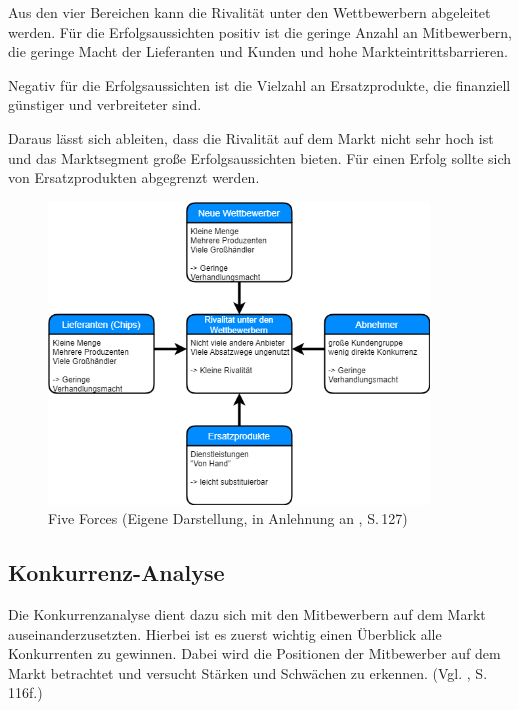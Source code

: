         \noindent
        Aus den vier Bereichen kann die Rivalität unter den Wettbewerbern abgeleitet werden. Für die Erfolgsaussichten
        positiv ist die geringe Anzahl an Mitbewerbern, die geringe Macht der Lieferanten und Kunden und hohe
        Markteintrittsbarrieren.

        \noindent
        Negativ für die Erfolgsaussichten ist die Vielzahl an Ersatzprodukte, die finanziell günstiger und verbreiteter
        sind.

        \noindent
        Daraus lässt sich ableiten, dass die Rivalität auf dem Markt nicht sehr hoch ist und das Marktsegment große
        Erfolgsaussichten bieten. Für einen Erfolg sollte sich von Ersatzprodukten abgegrenzt werden.
        \pagebreak

        \begin{figure}[ht]
            \centering
            \includegraphics[width = 0.9\textwidth]{Eigene Darstellungen/Distributionswege2.png}

            \caption{Five Forces (Eigene Darstellung, in Anlehnung an \cite{Gamayanto2005}, S.\,127)}
        \end{figure}

        \subsection{Konkurrenz-Analyse}

            Die Konkurrenzanalyse dient dazu sich mit den Mitbewerbern auf dem Markt auseinanderzusetzten. Hierbei ist
            es zuerst wichtig einen Überblick alle Konkurrenten zu gewinnen. Dabei wird die Positionen der Mitbewerber
            auf dem Markt betrachtet und versucht Stärken und Schwächen zu erkennen.
            (Vgl. \cite{Diller2007}, S.\,116f.)

